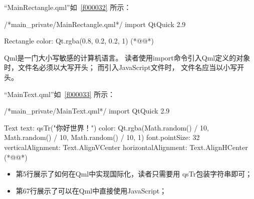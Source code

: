 “MainRectangle.qml”如\filesourcenumbernameone\ \ref{f000032}
所示：
\label{f000032}    %
\FloatBarrier                                  %
\begin{thebookfilesourceone}[escapeinside={(*@}{@*)},
caption=GoodLuck,
title=\filesourcenumbernameone \thefilesourcenumber
]
/*main_private/MainRectangle.qml*/
import QtQuick 2.9

Rectangle {
    color: Qt.rgba(0.8, 0.2, 0.2, 1)
}(*@\marginpar[\hfill\setlength\fboxsep{2pt}\fbox{\footnotesize{\kaishu\parbox{1em}{\setlength{\baselineskip}{2pt}\filesourcenumbernameone}}\footnotesize{\thefilesourcenumber}}]{\setlength\fboxsep{2pt}\fbox{\footnotesize{\kaishu\parbox{1em}{\setlength{\baselineskip}{2pt}\filesourcenumbernameone}}\footnotesize{\thefilesourcenumber}}}@*)\end{thebookfilesourceone}          %
\addtocounter{lstlisting}{-1}   %

Qml是一门大小写敏感的计算机语言。
读者使用import命令引入Qml定义的对象时，文件名必须以大写开头；
而引入JavaScript文件时，
文件名应当以小写开头。

“MainText.qml”如\filesourcenumbernameone\ \ref{f000033}
所示：

\label{f000033}    %
\FloatBarrier                                  %
\begin{thebookfilesourceone}[escapeinside={(*@}{@*)},
caption=GoodLuck,
title=\filesourcenumbernameone \thefilesourcenumber
]
/*main_private/MainText.qml*/
import QtQuick 2.9

Text {
    text: qsTr("你好世界！")
    color: Qt.rgba(Math.random() / 10, Math.random() / 10,
                   Math.random() / 10, 1)
    font.pointSize: 32
    verticalAlignment: Text.AlignVCenter
    horizontalAlignment: Text.AlignHCenter
}(*@\marginpar[\hfill\setlength\fboxsep{2pt}\fbox{\footnotesize{\kaishu\parbox{1em}{\setlength{\baselineskip}{2pt}\filesourcenumbernameone}}\footnotesize{\thefilesourcenumber}}]{\setlength\fboxsep{2pt}\fbox{\footnotesize{\kaishu\parbox{1em}{\setlength{\baselineskip}{2pt}\filesourcenumbernameone}}\footnotesize{\thefilesourcenumber}}}@*)\end{thebookfilesourceone}          %
\addtocounter{lstlisting}{-1}   %

\begin{itemize}

\item 第5行展示了如何在Qml中实现国际化，读者只需要用
qsTr包装字符串即可；
\item 第6\raisebox{0.16ex}{\sourcefonttwo\~{}}7行展示了可以在Qml中直接使用JavaScript；


\end{itemize}













